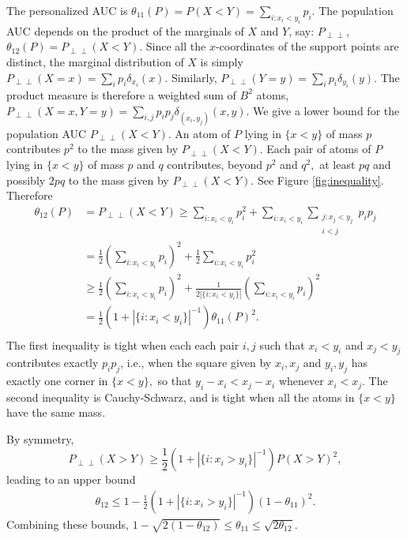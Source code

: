 \documentclass[12pt]{article}
\DeclareMathOperator{\AUC}{AUC}
\renewcommand{\P}{P}
\newcommand{\cind}{\perp \!\!\! \perp}
\newcommand{\aucindiv}{\theta_{11}}%
\newcommand{\aucpop}{\theta_{12}}%
\newcommand{\Pind}{P_{\cind}}
\begin{document}
The personalized AUC is $\aucindiv(P)=\P(X<Y)=\underset{i:x_i<y_i}{\sum} p_i.$
The population AUC depends on the product of the marginals  of $X$ and
$Y$, say: $\Pind$, $\theta_{12}(\P)=\Pind(X<Y).$
Since all the $x$-coordinates of the support points are distinct, the
marginal distribution of $X$ is simply
$\Pind(X=x)=\sum_i p_i\delta_{x_i}(x)$. Similarly,
$\Pind(Y=y)=\sum_i p_i\delta_{y_i}(y).$ The product measure is
therefore a weighted sum of $B^2$ atoms,
$\Pind(X=x,Y=y)=\sum_{i,j}p_ip_j\delta_{(x_i,y_j)}(x,y)$. We give a
lower bound for the population AUC $\Pind(X<Y)$. An atom of $\P$ lying
in $\{x<y\}$ of mass $p$ contributes $p^2$ to the mass given by
$\Pind(X<Y)$. Each pair of atoms of $\P$ lying in $\{x<y\}$ of mass
$p$ and $q$ contributes, beyond $p^2$ and $q^2,$ at least $pq$ and possibly $2pq$ to the mass
given by $\Pind(X<Y)$. See Figure \ref{fig:inequality}. %
Therefore
\begin{align}
  \aucpop(\P)&=\Pind(X<Y) \ge \sum_{i:x_i<y_i} p_i^2 +
           \sum_{i:x_i<y_i}\underset{\substack{j:x_j<y_j\\i<j}}{\sum} p_ip_j\\
         &= \frac{1}{2}\left(\underset{i:x_i<y_i}{\sum} p_i\right)^2 +
           \frac{1}{2}\underset{i:x_i<y_i}{\sum} p_i^2\\
         &\ge \frac{1}{2}\left(\underset{i:x_i<y_i}{\sum} p_i\right)^2 +
           \frac{1}{2|\{i:x_i<y_i\}|}\left(\underset{i:x_i<y_i}{\sum} p_i\right)^2\\
         &= \frac{1}{2}(1+|\{i:x_i<y_i\}|^{-1})\aucindiv(\P)^2.\\
\end{align}
The first inequality is tight when each each pair $i,j$ such that
$x_i<y_i$ and $x_j<y_j$ contributes exactly $p_ip_j$, i.e., when the
square given by $x_i,x_j$ and $y_i,y_j$ has exactly one corner in
$\{x<y\},$ so that $y_i-x_i < x_j-x_i$ whenever $x_i<x_j$. The second inequality is Cauchy-Schwarz, and is
tight when all the atoms in $\{x<y\}$ have the same mass.

By symmetry,
$$
\P_{\cind}(X>Y) \ge \frac{1}{2}(1+|\{i:x_i>y_i\}|^{-1})\P(X>Y)^2,
$$
leading to an upper bound
\begin{align}
  \aucpop \le 1 - \frac{1}{2}(1+|\{i:x_i>y_i\}|^{-1})(1-\aucindiv)^2.
\end{align}
Combining these bounds,
$
1-\sqrt{2(1-\aucpop)} \le \aucindiv \le \sqrt{2\aucpop}.
$
\end{document}
